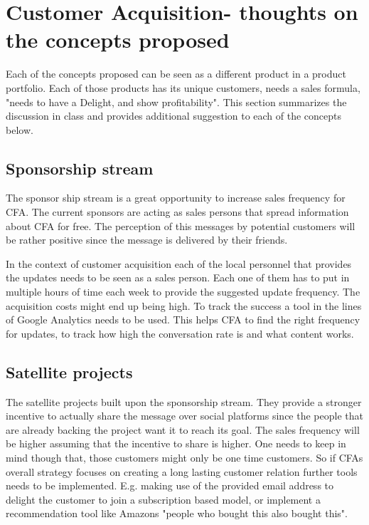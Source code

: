 \section{Customer Acquisition- thoughts on the concepts proposed}

Each of the concepts proposed can be seen as a different product in a product portfolio. Each of those products has its unique customers, needs a sales formula, "needs to have a Delight, and show profitability"\cite{Ramfelt}. This section summarizes the discussion in class and provides additional suggestion to each of the concepts below.

\subsection{Sponsorship stream}

The sponsor ship stream is a great opportunity to increase sales frequency for CFA. The current sponsors are acting as sales persons that spread information about CFA for free. The perception of this messages by potential customers will be rather positive since the message is delivered by their friends.
 
In the context of customer acquisition each of the local personnel that provides the updates needs to be seen as a sales person. Each one of them has to put in multiple hours of time each week to provide the suggested update frequency. The acquisition costs might end up being high. To track the success a tool in the lines of Google Analytics needs to be used. This helps CFA to find the right frequency for updates, to track how high the conversation rate is and what content works.


\subsection{Satellite projects}

The satellite projects built upon the sponsorship stream. They provide a stronger incentive to actually share the message over social platforms since the people that are already backing the project want it to reach its goal. The sales frequency will be higher assuming that the incentive to share is higher. One needs to keep in mind though that, those customers might only be one time customers. So if CFAs overall strategy focuses on creating a long lasting customer relation further tools needs to be implemented. E.g. making use of the provided email address to delight the customer to join a subscription based model, or implement a recommendation tool like Amazons "people who bought this also bought this".


